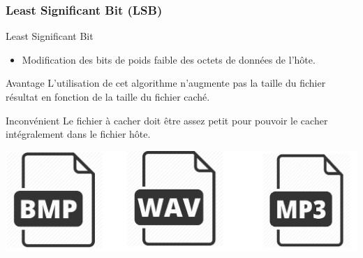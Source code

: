 \documentclass{beamer}
\begin{document}
	\subsubsection{Least Significant Bit (LSB)}
	\begin{frame}
  
	\begin{block}{Least Significant Bit}
	\begin{itemize}
	[circle]
	\item Modification des bits de poids faible des octets de données de 
	l'hôte. 
	\end{itemize}
	\end{block}
	
	\begin{exampleblock}{Avantage} 
	L'utilisation de cet algorithme n'augmente pas la taille du fichier 
	résultat en fonction de la taille du fichier caché. 
	\end{exampleblock}
	
	\begin{alertblock}{Inconvénient} 
	Le fichier à cacher doit être assez petit pour pouvoir le cacher intégralement 
	dans le fichier hôte. 
	\end{alertblock}
	
	\hspace{2.5cm}
    \includegraphics[scale=0.1]{pictures/lsb.png}
	\end{frame}
  
\end{document}

